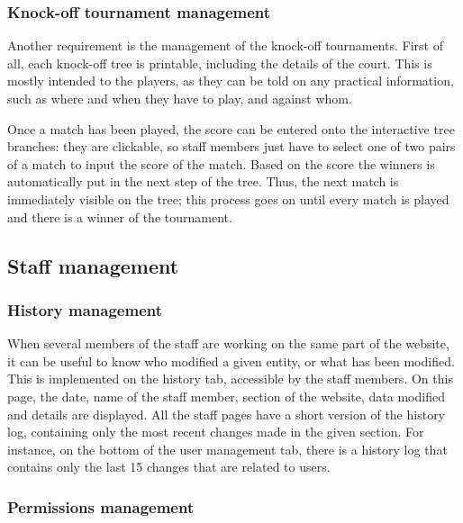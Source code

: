 \subsubsection{Knock-off tournament management}
\label{subs:Knock-off tournament management}


Another requirement is the management of the knock-off tournaments. First of
all, each knock-off tree is printable, including the details of the court.
This is mostly intended to the players, as they can be told on any practical
information, such as where and when they have to play, and against whom.
\newline

Once a match has been played, the score can be entered onto the interactive
tree branches: they are clickable, so staff members just have to select one of
two pairs of a match to input the score of the match. Based on the score
the winners is automatically put in the next step of the tree. Thus, the next
match is immediately visible on the tree; this process goes on until every
match is played and there is a winner of the tournament.

\subsection{Staff management}
\label{sub:Staff management}

\subsubsection{History management}
\label{subs:History management}


When several members of the staff are working on the same part of the website,
it can be useful to know who modified a given entity, or what has been modified.
This is implemented on the history tab, accessible by the staff members. On
this page, the date, name of the staff member, section of the website, data
modified and details are displayed. All the staff pages have a short version of
the history log, containing only the most recent changes made in the given
section. For instance, on the bottom of the user management tab, there is a
history log that contains only the last 15 changes that are related to users.

\subsubsection{Permissions management}
\label{subs:Permissions management}


